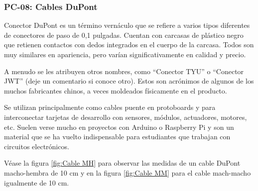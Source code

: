     \subsubsection{PC-08: Cables DuPont }
    
    Conector DuPont es un término vernáculo que se refiere a varios tipos diferentes de conectores de paso de 0,1 pulgadas. Cuentan con carcasas de plástico negro que retienen contactos con dedos integrados en el cuerpo de la carcasa. Todos son muy similares en apariencia, pero varían significativamente en calidad y precio.
    
    A menudo se les atribuyen otros nombres, como “Conector TYU” o “Conector JWT” (deje un comentario si conoce otro). Estos son acrónimos de algunos de los muchos fabricantes chinos, a veces moldeados físicamente en el producto. \cite{Mateo}
    
    Se utilizan principalmente como cables puente en protoboards y para interconectar tarjetas de desarrollo con sensores, módulos, actuadores, motores, etc. Suelen verse mucho en proyectos con Arduino o Raspberry Pi y son un material que se ha vuelto indispensable para estudiantes que trabajan con circuitos electrónicos. 
    
    Véase la figura \ref{fig:Cable MH} para observar las medidas de un cable DuPont macho-hembra de 10 cm y en la figura \ref{fig:Cable MM} para el cable mach-macho igualmente de 10 cm.
    
    
    
